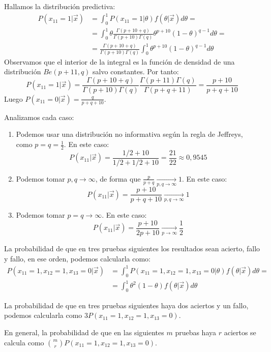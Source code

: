 \begin{example}
    Hallamos la distribución predictiva:
    \begin{align*}
        P(x_{11}=1|\vec{x}) & = \int_0^1 P(x_{11}=1|\theta)f(\theta|\vec{x})d\theta =                                               \\
                            & = \int_0^1 \theta \frac{\Gamma(p+10+q)}{\Gamma(p+10)\Gamma(q)} \theta^{p+10}(1-\theta)^{q-1}d\theta = \\
                            & = \frac{\Gamma(p+10+q)}{\Gamma(p+10)\Gamma(q)} \int_0^1 \theta^{p+10}(1-\theta)^{q-1}d\theta
    \end{align*}
    Observamos que el interior de la integral es la función de densidad de una distribución $Be(p+11, q)$ salvo constantes.
    Por tanto:
    $$P(x_{11}=1|\vec{x}) = \frac{\Gamma(p+10+q)}{\Gamma(p+10)\Gamma(q)} \frac{\Gamma(p+11)\Gamma(q)}{\Gamma(p+q+11)} = \frac{p+10}{p+q+10}$$
    Luego $P(x_{11}=0|\vec{x}) = \frac{q}{p+q+10}$.

    Analizamos cada caso:
    \begin{enumerate}
        \item Podemos usar una distribución no informativa según la regla de Jeffreys, como $p = q = \frac{1}{2}$.
              En este caso:
              $$P(x_{11}|\vec{x}) = \frac{1/2+10}{1/2+1/2+10} = \frac{21}{22} \approx 0,9545$$
        \item Podemos tomar $p, q \to \infty$, de forma que $\frac{p}{p+q} \xrightarrow[p, q \to \infty]{} 1$.
              En este caso:
              $$P(x_{11}|\vec{x}) = \frac{p+10}{p+q+10} \xrightarrow[p, q \to \infty]{} 1$$
        \item Podemos tomar $p = q \to \infty$.
              En este caso:
              $$P(x_{11}|\vec{x}) = \frac{p+10}{2p+10} \xrightarrow[p \to \infty]{} \frac{1}{2}$$
    \end{enumerate}

    La probabilidad de que en tres pruebas siguientes los resultados sean acierto, fallo y fallo, en ese orden, podemos calcularla como:
    \begin{align*}
        P(x_{11} = 1, x_{12} = 1, x_{13} = 0|\vec{x}) & = \int_0^1 P(x_{11} = 1, x_{12} = 1, x_{13} = 0|\theta)f(\theta|\vec{x})d\theta = \\
                                                      & = \int_0^1 \theta^2(1-\theta)f(\theta|\vec{x})d\theta
    \end{align*}

    La probabilidad de que en tres pruebas siguientes haya dos aciertos y un fallo, podemos calcularla como $3P(x_{11} = 1, x_{12} = 1, x_{13} = 0)$.

    En general, la probabilidad de que en las siguientes $m$ pruebas haya $r$ aciertos se calcula como $\binom{m}{r}P(x_{11} = 1, x_{12} = 1, x_{13} = 0)$.
\end{example}

